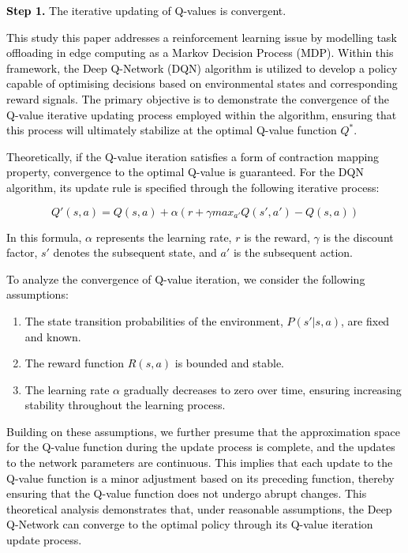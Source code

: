 \documentclass[preprint,12pt]{elsarticle}
\begin{document}
\textcolor{black}{\textbf{Step 1.}	The iterative updating of Q-values is convergent.}

\textcolor{black}{This study this paper addresses a reinforcement learning issue by modelling task offloading in edge computing as a Markov Decision Process (MDP). Within this framework, the Deep Q-Network (DQN) algorithm is utilized to develop a policy capable of optimising decisions based on environmental states and corresponding reward signals. The primary objective is to demonstrate the convergence of the Q-value iterative updating process employed within the algorithm, ensuring that this process will ultimately stabilize at the optimal Q-value function \(Q^*\).}

\textcolor{black}{Theoretically, if the Q-value iteration satisfies a form of contraction mapping property, convergence to the optimal Q-value is guaranteed. For the DQN algorithm, its update rule is specified through the following iterative process:}

\textcolor{black}{
\begin{equation}
\label{eq. 22}
    Q' (s,a)=Q(s,a)+\alpha(r+\gamma max_{a'}Q(s',a')-Q(s,a))
\end{equation}
}

\textcolor{black}{In this formula, \(\alpha\) represents the learning rate, \(r\) is the reward, \(\gamma\) is the discount factor, \(s'\) denotes the subsequent state, and \(a'\) is the subsequent action.}

\textcolor{black}{To analyze the convergence of Q-value iteration, we consider the following assumptions:}

\begin{enumerate}
    \item \textcolor{black}{The state transition probabilities of the environment, \(P(s'|s,a)\), are fixed and known.}
    
    \item \textcolor{black}{The reward function \(R(s, a)\) is bounded and stable.}
    
    \item \textcolor{black}{The learning rate \(\alpha\) gradually decreases to zero over time, ensuring increasing stability throughout the learning process.}
\end{enumerate}

\textcolor{black}{Building on these assumptions, we further presume that the approximation space for the Q-value function during the update process is complete, and the updates to the network parameters are continuous. This implies that each update to the Q-value function is a minor adjustment based on its preceding function, thereby ensuring that the Q-value function does not undergo abrupt changes. This theoretical analysis demonstrates that, under reasonable assumptions, the Deep Q-Network can converge to the optimal policy through its Q-value iteration update process.}
\end{document}
